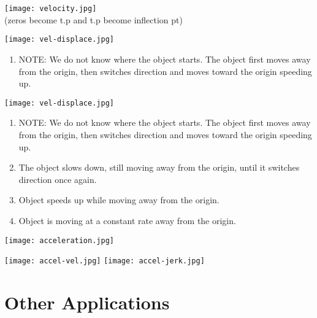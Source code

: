 \documentclass[12pt,fleqn]{book} %
\begin{document}
\begin{multicols}{2}
    \texttt{[image: velocity.jpg]} \\
    (zeros become t.p and t.p become inflection pt) \\
    \begin{center}
        \texttt{[image: vel-displace.jpg]}
        \begin{enumerate}[label=(\alph*)]
            \item NOTE: We do not know where the object starts. The object first moves away from the origin, then switches direction and moves toward the origin speeding up.
        \end{enumerate}

    \end{center}
    \columnbreak

    \hspace*{-20mm}

    \begin{center}
        \texttt{[image: vel-displace.jpg]}
        \begin{enumerate}[label=(\alph*)]
            \item NOTE: We do not know where the object starts. The object first moves away from the origin, then switches direction and moves toward the origin speeding up.
            \item The object slows down, still moving away from the origin, until it switches direction once again.
            \item Object speeds up while moving away from the origin.
            \item Object is moving at a constant rate away from the origin.
        \end{enumerate}

    \end{center}


\end{multicols}

\pagebreak

\begin{multicols}{2}
    \texttt{[image: acceleration.jpg]}
    \columnbreak

    \texttt{[image: accel-vel.jpg]}
    \texttt{[image: accel-jerk.jpg]}
\end{multicols}


\section{Other Applications}

\begin{center}

\end{center}

\vspace*{-3mm}

\pagebreak

\begin{center}

\end{center}
\end{document}
